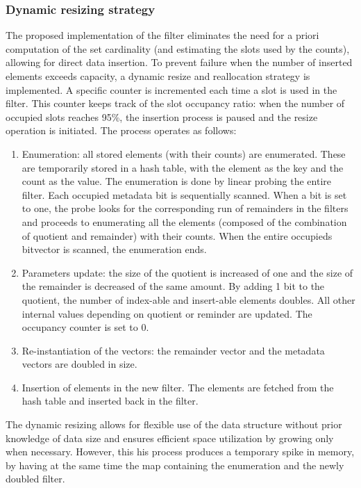 \subsubsection{Dynamic resizing strategy}
The proposed implementation of the filter eliminates the need for a priori computation of the \kmer set cardinality (and estimating the slots used by the counts), allowing for direct data insertion. To prevent failure when the number of inserted elements exceeds capacity, a dynamic resize and reallocation strategy is implemented. A specific counter is incremented each time a slot is used in the filter. This counter keeps track of the slot occupancy ratio: when the number of occupied slots reaches 95\%, the insertion process is paused and the resize operation is initiated. The process operates as follows: 
\begin{enumerate}
	\item Enumeration: all stored elements (with their counts) are enumerated. These are temporarily stored in a hash table, with the element as the key and the count as the value. The enumeration is done by linear probing the entire filter. Each occupied metadata bit is sequentially scanned. When a bit is set to one, the probe looks for the corresponding run of remainders in the filters and proceeds to enumerating all the elements (composed of the combination of quotient and remainder) with their counts. When the entire occupieds bitvector is scanned, the enumeration ends.
	\item Parameters update: the size of the quotient is increased of one and the size of the remainder is decreased of the same amount. By adding 1 bit to the quotient, the number of index-able and insert-able elements doubles. All other internal values depending on quotient or reminder are updated. The occupancy counter is set to 0.
	\item Re-instantiation of the vectors: the remainder vector and the metadata vectors are doubled in size.
	\item Insertion of elements in the new filter. The elements are fetched from the hash table and inserted back in the filter.
\end{enumerate}
The dynamic resizing allows for flexible use of the data structure without prior knowledge of data size and ensures efficient space utilization by growing only when necessary. However, this his process produces a temporary spike in memory, by having at the same time the map containing the enumeration and the newly doubled filter.

